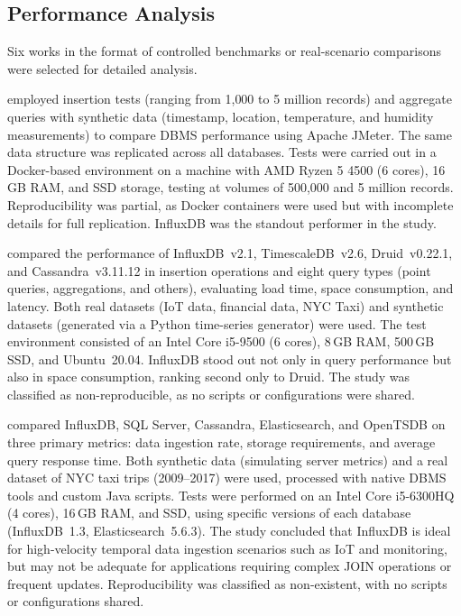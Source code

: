 \subsection{Performance Analysis}

Six works in the format of controlled benchmarks or real-scenario comparisons were selected
for detailed analysis.

\cite{lima2024avaliando} employed insertion tests (ranging from 1{,}000 to 5 million records)
and aggregate queries with synthetic data (timestamp, location, temperature, and humidity
measurements) to compare DBMS performance using Apache JMeter. The same data structure was
replicated across all databases. Tests were carried out in a Docker-based environment on a
machine with AMD Ryzen 5 4500 (6 cores), 16\,GB RAM, and SSD storage, testing at volumes of
500{,}000 and 5 million records. Reproducibility was partial, as Docker containers were used
but with incomplete details for full replication. InfluxDB was the standout performer in
the study.

\cite{shah2022performance} compared the performance of InfluxDB~v2.1, TimescaleDB~v2.6,
Druid~v0.22.1, and Cassandra~v3.11.12 in insertion operations and eight query types (point
queries, aggregations, and others), evaluating load time, space consumption, and latency.
Both real datasets (IoT data, financial data, NYC Taxi) and synthetic datasets (generated via
a Python time-series generator) were used. The test environment consisted of an Intel Core
i5-9500 (6 cores), 8\,GB RAM, 500\,GB SSD, and Ubuntu~20.04. InfluxDB stood out not only
in query performance but also in space consumption, ranking second only to Druid. The study
was classified as non-reproducible, as no scripts or configurations were shared.

\cite{naqvi2017influxdb} compared InfluxDB, SQL Server, Cassandra, Elasticsearch, and OpenTSDB
on three primary metrics: data ingestion rate, storage requirements, and average query response
time. Both synthetic data (simulating server metrics) and a real dataset of NYC taxi trips
(2009--2017) were used, processed with native DBMS tools and custom Java scripts. Tests were
performed on an Intel Core i5-6300HQ (4 cores), 16\,GB RAM, and SSD, using specific versions
of each database (InfluxDB~1.3, Elasticsearch~5.6.3). The study concluded that InfluxDB is
ideal for high-velocity temporal data ingestion scenarios such as IoT and monitoring, but may
not be adequate for applications requiring complex JOIN operations or frequent updates.
Reproducibility was classified as non-existent, with no scripts or configurations shared.

